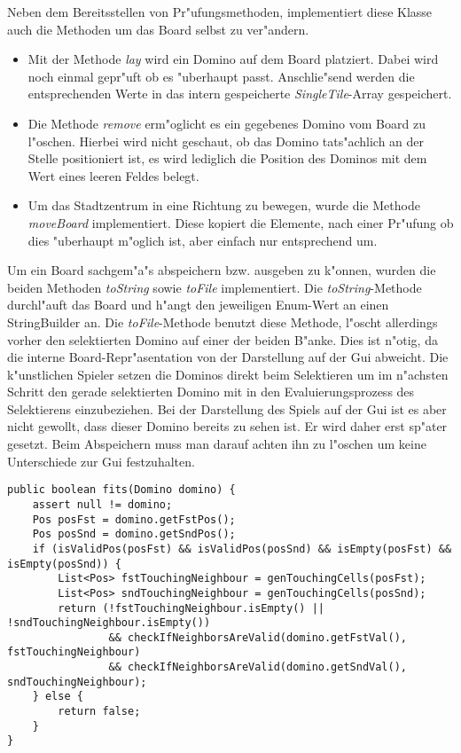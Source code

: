 Neben dem Bereitsstellen von Pr"ufungsmethoden, implementiert diese Klasse auch die Methoden um das Board selbst zu ver"andern. 
\begin{itemize}
	\item Mit der Methode \emph{lay} wird ein Domino auf dem Board platziert. Dabei wird noch einmal gepr"uft ob es "uberhaupt passt. Anschlie"send werden die entsprechenden Werte in das intern gespeicherte \emph{SingleTile}-Array gespeichert. 
	\item Die Methode \emph{remove} erm"oglicht es ein gegebenes Domino vom Board zu l"oschen. Hierbei wird nicht geschaut, ob das Domino tats"achlich an der Stelle positioniert ist, es wird lediglich die Position des Dominos mit dem Wert eines leeren Feldes belegt. 
	\item Um das Stadtzentrum in eine Richtung zu bewegen, wurde die Methode \emph{moveBoard} implementiert. Diese kopiert die Elemente, nach einer Pr"ufung ob dies "uberhaupt m"oglich ist, aber einfach nur entsprechend um. 
\end{itemize}

Um ein Board sachgem"a"s abspeichern bzw. ausgeben zu k"onnen, wurden die beiden Methoden \emph{toString} sowie \emph{toFile} implementiert. Die \emph{toString}-Methode durchl"auft das Board und h"angt den jeweiligen Enum-Wert an einen StringBuilder an. Die \emph{toFile}-Methode benutzt diese Methode, l"oscht allerdings vorher den selektierten Domino auf einer der beiden B"anke. Dies ist n"otig, da die interne Board-Repr"asentation von der Darstellung auf der Gui abweicht. Die k"unstlichen Spieler setzen die Dominos direkt beim Selektieren um im n"achsten Schritt den gerade selektierten Domino mit in den Evaluierungsprozess des Selektierens einzubeziehen. Bei der Darstellung des Spiels auf der Gui ist es aber nicht gewollt, dass dieser Domino bereits zu sehen ist. Er wird daher erst sp"ater gesetzt. Beim Abspeichern muss man darauf achten ihn zu l"oschen um keine Unterschiede zur Gui festzuhalten. 
\begin{lstlisting}[float,style=CodeHighlighting,caption=Board - fits,label=lst:board_fits]
public boolean fits(Domino domino) {
    assert null != domino;
    Pos posFst = domino.getFstPos();
    Pos posSnd = domino.getSndPos();
    if (isValidPos(posFst) && isValidPos(posSnd) && isEmpty(posFst) && isEmpty(posSnd)) {
        List<Pos> fstTouchingNeighbour = genTouchingCells(posFst);
        List<Pos> sndTouchingNeighbour = genTouchingCells(posSnd);
        return (!fstTouchingNeighbour.isEmpty() || !sndTouchingNeighbour.isEmpty())
                && checkIfNeighborsAreValid(domino.getFstVal(), fstTouchingNeighbour)
                && checkIfNeighborsAreValid(domino.getSndVal(), sndTouchingNeighbour);
    } else {
        return false;
    }
}
\end{lstlisting}